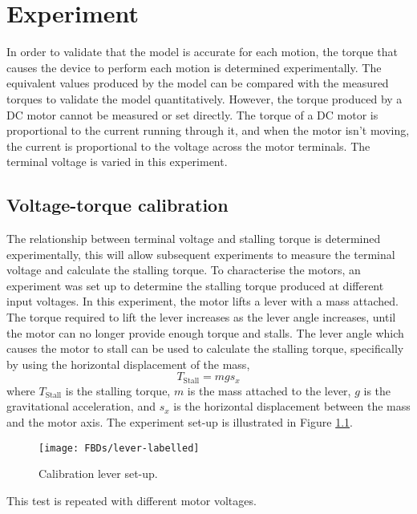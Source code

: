 \chapter{Experiment}

In order to validate that the model is accurate for each motion, the torque that causes the device to perform each motion is determined experimentally. The equivalent values produced by the model can be compared with the measured torques to validate the model quantitatively. However, the torque produced by a DC motor cannot be measured or set directly. The torque of a DC motor is proportional to the current running through it, and when the motor isn't moving, the current is proportional to the voltage across the motor terminals. The terminal voltage is varied in this experiment.

\section{Voltage-torque calibration} \label{sec:Voltage-torque calibration}
The relationship between terminal voltage and stalling torque is determined experimentally, this will allow subsequent experiments to measure the terminal voltage and calculate the stalling torque.
To characterise the motors, an experiment was set up to determine the stalling torque produced at different input voltages. In this experiment, the motor lifts a lever with a mass attached. The torque required to lift the lever increases as the lever angle increases, until the motor can no longer provide enough torque and stalls. The lever angle which causes the motor to stall can be used to calculate the stalling torque, specifically by using the horizontal displacement of the mass,
\begin{equation}
	T_\mathrm{Stall} = m g s_x
\end{equation}
where $T_\mathrm{Stall}$ is the stalling torque, $m$ is the mass attached to the lever, $g$ is the gravitational acceleration, and $s_x$ is the horizontal displacement between the mass and the motor axis. The experiment set-up is illustrated in Figure \ref{fig:lever-labelled}.
\begin{figure}[!h]
	\centering
	\texttt{[image: FBDs/lever-labelled]}
	\caption{Calibration lever set-up.}
	\label{fig:lever-labelled}
\end{figure}
This test is repeated with different motor voltages.\\

